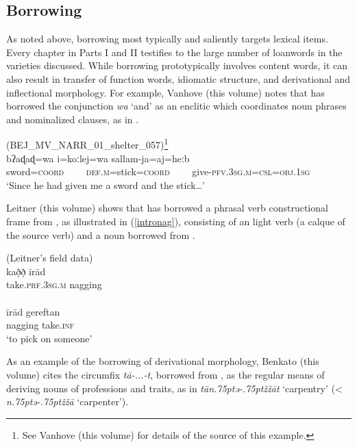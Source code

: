 \documentclass[output=paper]{langsci/langscibook}
\begin{document}
\subsection{Borrowing}\label{introborrowing}

As noted above, borrowing most typically and saliently targets lexical items. Every chapter in Parts I and II testifies to the large number of {loanwords} in the varieties discussed. While borrowing prototypically involves content words, it can also result in {transfer} of function words, {idiomatic} structure, and {derivational} and {inflectional} morphology. For example, Vanhove (this volume) notes that  has borrowed the  conjunction \textit{wa} `and' as an enclitic which coordinates noun phrases and nominalized clauses, as in .

\ea \label{introsword}
{ (BEJ\_MV\_NARR\_01\_shelter\_057)\footnote{See Vanhove (this volume) for details of the source of this example.}}\\
\gll bʔaɖaɖ=wa i=koːlej=wa sallam-ja=aj=heːb\\
     sword=\textsc{coord}~~~~ \textsc{def.m}=stick=\textsc{coord}~~~~ give-\textsc{pfv.3sg.m=csl=obj.1sg}\\
\glt `Since he had given me a sword and the stick…'
\z


Leitner (this volume) shows that   has borrowed a phrasal verb constructional frame from , as illustrated in (\ref{intronag}), consisting of an  {light verb} (a {calque} of the  source verb) and a noun borrowed from .


\ea \label{intronag}
\ea {}  (Leitner's field data)\\
\gll kað̣ð̣ īrād\\
     take.\textsc{prf}.3\textsc{sg}.\textsc{m} nagging\\
\\
\gll īrād gereftan\\
     nagging take.\textsc{inf}\\
\glt ‘to pick on someone’
\z
\z


As an example of the borrowing of {derivational} morphology, Benkato (this volume) cites the   circumfix \textit{tā-...-t}, borrowed from , as the regular means of deriving nouns of professions and traits, as in \textit{tān\kern .75ptǝ\kern -.75ptžžā{\R}t} ‘carpentry’ (< \textit{n\kern .75ptǝ\kern -.75ptžžā\R} `carpenter').
\end{document}
